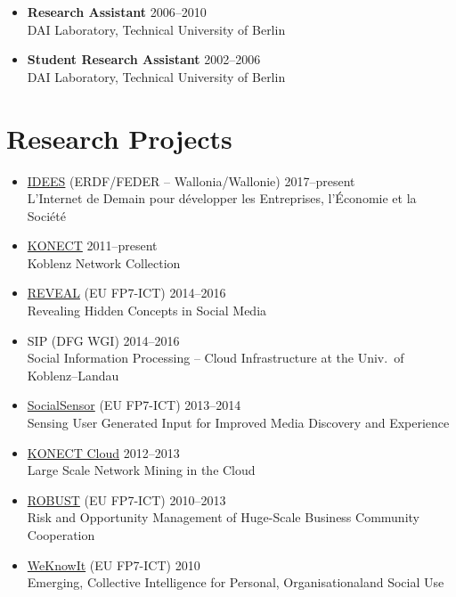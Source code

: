 \documentclass[line,mm]{res}
\newcounter{x}
\newcounter{y}
\begin{document}
\begin{resume}
\begin{itemize}
\item[]
\textbf{Research Assistant} \hfill 2006--2010 \\
DAI Laboratory, Technical University of Berlin 

\item[]
\textbf{Student Research Assistant} \hfill 2002--2006 \\
DAI Laboratory, Technical University of Berlin 

\end{itemize}

\section{Research Projects}
\begin{itemize}
\item 
  \href{http://nouvelles.unamur.be/upnews.2015-10-01.8995593781}{IDEES} (ERDF/FEDER -- Wallonia/Wallonie) \hfill 2017--present \\
  L'Internet de Demain pour développer les Entreprises, l'Économie et la Société 
\item \href{http://konect.cc/}{KONECT} \hfill 2011--present \\
  Koblenz Network Collection
\item \href{http://revealproject.eu/}{REVEAL} (EU FP7-ICT) \hfill 2014--2016 \\
  Revealing Hidden Concepts in Social Media
\item SIP (DFG WGI) \hfill 2014--2016 \\
  Social Information Processing -- Cloud Infrastructure at the Univ.\ of Koblenz--Landau
\item \href{http://www.socialsensor.eu/}{SocialSensor} (EU FP7-ICT) \hfill 2013--2014 \\
  Sensing User Generated Input for Improved Media Discovery and Experience
\item \href{https://books.google.be/books?id=06fDCQAAQBAJ&pg=PA107}{KONECT Cloud} \hfill 2012--2013 \\
  Large Scale Network Mining in the Cloud
\item \href{http://www.robust-project.eu/}{ROBUST} (EU FP7-ICT) \hfill 2010--2013 \\
  Risk and Opportunity Management of Huge-Scale Business Community Cooperation 
\item \href{http://www.weknowit.eu/}{WeKnowIt} (EU FP7-ICT) \hfill 2010 \\
   Emerging, Collective Intelligence for Personal, Organisationaland Social Use

\end{itemize}
\end{resume}
\end{document}

